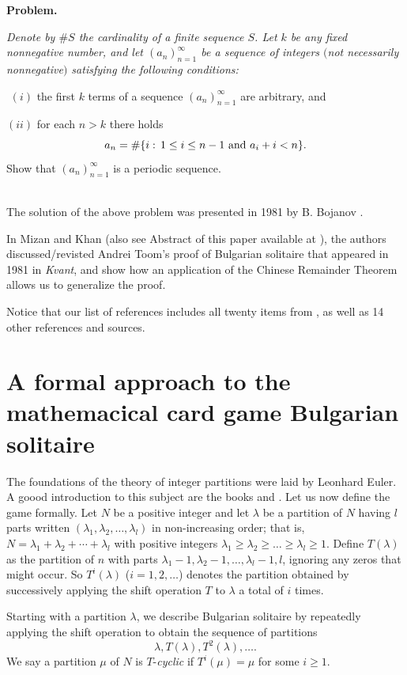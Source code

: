 \documentclass[oneside,12pt]{amsart}
\theoremstyle{definition}
\numberwithin{equation}{section}
\begin{document}
{\bf Problem.} {\it Denote by $\# S$ the cardinality of a finite sequence $S$. 
Let $k$ be any fixed nonnegative number, and let  
$(a_n)_{n=1}^{\infty}$ be a sequence of integers $($not necessarily 
nonnegative$)$
satisfying the following conditions:

$\,\,(i)$ the first $k$ terms of a sequence $(a_n)_{n=1}^{\infty}$ are arbitrary, and

$(ii)$ for each $n>k$ there holds
  $$
a_n=\# \{i:\,1\le i\le n-1\,\, {\rm and}\,\, a_i+i<n \}.
  $$ 
Show that $(a_n)_{n=1}^{\infty}$ is a periodic sequence.}\\


The solution of the above problem was presented in 1981 by B. Bojanov 
\cite{bo}.

In  \cite{kkh} Mizan and Khan (also see Abstract of this paper
available at \cite{kh}), the authors discussed/revisted  Andrei Toom's proof 
of Bulgarian solitaire that appeared in 1981 in {\it Kvant}, 
and show how an application of the Chinese Remainder Theorem
allows us to generalize the proof.

Notice that our list of references includes all twenty items 
from \cite{ho}, as well as 
14 other references and sources.

\section{A formal approach to the mathemacical card game Bulgarian solitaire}

The foundations of the theory of integer partitions were laid by Leonhard 
Euler. A goood introduction to this subject are the books \cite{a} and 
 \cite{ae}. 
Let us now define the game  formally.
  Let $N$ be a positive integer and let $\lambda$ be a partition of
 $N$ having $l$ parts written
 $(\lambda_1, \lambda_2,\ldots,\lambda_l)$ in non-increasing order;
that is, $N=\lambda_1+ \lambda_2+\cdots+\lambda_l$ with positive
integers $\lambda_1\ge \lambda_2\ge\ldots\ge \lambda_l\ge 1$.
 Define $T(\lambda)$ as the partition of $n$ with parts $\lambda_1-1, \lambda_2-1,\ldots,\lambda_l-1, l$, ignoring any
 zeros that might occur. So $T^i(\lambda)$ ($i=1,2,\ldots$) denotes the
 partition obtained by successively applying the shift operation $T$ to
 $\lambda$ a total of $i$ times.
 
  Starting with a partition $\lambda$,
 we describe Bulgarian solitaire by repeatedly applying the shift
 operation to obtain the sequence of partitions
     $$
     \lambda, T(\lambda),T^2(\lambda),\ldots .
      $$
    We say a partition $\mu$ of $N$ is $T$-{\it cyclic} if $T^i(\mu)=\mu$
  for some $i\ge 1$. 
\end{document}
